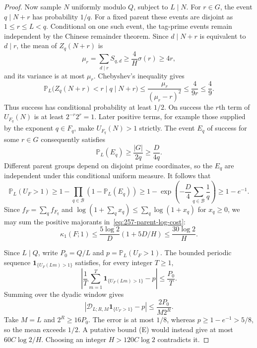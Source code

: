 \documentclass[11pt]{article}
\theoremstyle{plain}
\theoremstyle{definition}
\theoremstyle{remark}
\begin{document}
\begin{proof}
Now sample $N$ uniformly modulo $Q$, subject to $L\mid N$.
For $r\in G$, the event $q\mid N+r$ has probability $1/q$.
For a fixed parent these events are disjoint as $1\le r\le L<q$.
Conditional on one such event, the tag-prime events remain independent
by the Chinese remainder theorem.  Since $d\mid N+r$ is equivalent to
$d\mid r$, the mean of $Z_q(N+r)$ is
\[
 \mu_r=\sum_{d\mid r}S_{q,d}
 \ge\frac4H\sigma(r)\ge4r,
\]
and its variance is at most $\mu_r$.
Chebyshev's inequality gives
\[
 \mathbb P_L\bigl(Z_q(N+r)<r\mid q\mid N+r\bigr)
 \le\frac{\mu_r}{(\mu_r-r)^2}
 \le\frac4{9r}\le\frac49.
\]
Thus success has conditional probability at least $1/2$.
On success the $r$th term of $U_{F_q}(N)$ is at least
$2^{-r}2^r=1$.  Later positive terms, for example those supplied by the
exponent $q\in F_q$, make $U_{F_q}(N)>1$ strictly.
The event $E_q$ of success for some $r\in G$ consequently satisfies
\[
 \mathbb P_L(E_q)\ge\frac{|G|}{2q}\ge\frac{D}{4q}.
\]
Different parent groups depend on disjoint prime coordinates, so the
$E_q$ are independent under this conditional uniform measure.  It follows
that
\[
 \mathbb P_L(U_F>1)\ge
 1-\prod_{q\in\mathcal B}(1-\mathbb P_L(E_q))
 \ge1-\exp\left(-\frac D4\sum_{q\in\mathcal B}\frac1q\right)
 \ge1-e^{-1}.
\]
Since $f_F=\sum_qf_{F_q}$ and
$\log(1+\sum_qx_q)\le\sum_q\log(1+x_q)$ for $x_q\ge0$,
we may sum the positive majorants in~\eqref{eq:257-parent-log-cost}:
\[
 \kappa_1(F;1)\le\frac{5\log2}{D}(1+5D/H)
 \le\frac{30\log2}{H}.
\]

Since $L\mid Q$, write $P_0=Q/L$ and $p=\mathbb P_L(U_F>1)$.  The bounded periodic
sequence $\mathbf1_{\{U_F(Lm)>1\}}$ satisfies, for every integer $T\ge1$,
\[
 \left|\frac1T\sum_{m=1}^{T}\mathbf1_{\{U_F(Lm)>1\}}-p\right|
 \le\frac{P_0}{T}.
\]
Summing over the dyadic window gives
\[
 \left|\mathscr D_{L;R,M}\mathbf1_{\{U_F>1\}}-p\right|
 \le\frac{2P_0}{M2^R}.
\]
Take $M=L$ and $2^R\ge16P_0$.  The error is at most $1/8$, whereas
$p\ge1-e^{-1}>5/8$, so the mean exceeds $1/2$.
A putative bound (E) would instead give at most $60C\log2/H$.
Choosing an integer $H>120C\log2$ contradicts it.
\end{proof}
\end{document}

